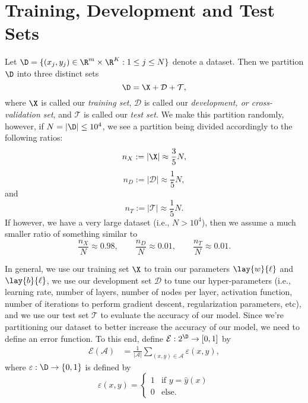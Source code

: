 

\section{Training, Development and Test Sets}

Let $\D=\{(x_j,y_j)\in\R^m\times\R^K:1\leq j\leq N\}$ denote a dataset.  Then we partition $\D$ into three distinct sets
$$\D=\X+\mathcal{D}+\mathcal{T},$$
where $\X$ is called our \textit{training set}, $\mathcal{D}$ is called our \textit{development, or cross-validation set}, and $\mathcal{T}$ is called our \textit{test set}. We make this partition randomly, however, if $N=|\D|\leq 10^4$, we see a partition being divided accordingly to the following ratios:
$$n_X:=|\X|\approx \frac{3}{5}N,$$
$$n_D:=|\mathcal{D}|\approx\frac{1}{5}N,$$
and
$$n_T:=|\mathcal{T}|\approx\frac{1}{5}N.$$
If however, we have a very large dataset (i.e., $N>10^4$), then we assume a much smaller ratio of something similar to
$$\frac{n_X}{N}\approx0.98,\qquad\frac{n_D}{N}\approx 0.01,\qquad\frac{n_T}{N}\approx 0.01.$$

In general, we use our training set $\X$ to train our parameters $\lay{w}{\ell}$ and $\lay{b}{\ell}$, we use our development set $\mathcal{D}$ to tune our hyper-parameters (i.e., learning rate, number of layers, number of nodes per layer, activation function, number of iterations to perform gradient descent, regularization parameters, etc), and we use our test set $\mathcal{T}$ to evaluate the accuracy of our model.  Since we're partitioning our dataset to better increase the accuracy of our model, we need to define an error function.  To this end, define $\mathcal{E}:2^\D\to[0,1]$ by
\begin{align*}
	\mathcal{E}(\mathcal{A})&=\frac{1}{|\mathcal{A}|}\sum_{(x,y)\in\mathcal{A}}\varepsilon(x,y),
\end{align*}
where $\varepsilon:\D\to\{0,1\}$ is defined by
$$\varepsilon(x,y)=\begin{cases}
	1&\text{if }y = \hat{y}(x)\\
	0&\text{else.}
\end{cases}$$

